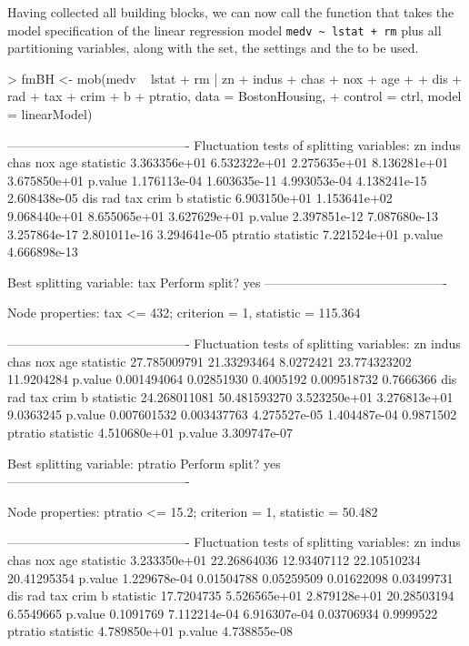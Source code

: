 \documentclass{Z}
\begin{document}
Having collected all building blocks, we can now call the function 
that takes the model specification of the linear regression model \verb:medv ~ lstat + rm:
plus all partitioning variables, along with the  set, the 
settings and the  to be used.

\begin{Schunk}
\begin{Sinput}
> fmBH <- mob(medv ~ lstat + rm | zn + indus + chas + nox + age + 
+     dis + rad + tax + crim + b + ptratio, data = BostonHousing, 
+     control = ctrl, model = linearModel)
\end{Sinput}
\begin{Soutput}
-------------------------------------------
Fluctuation tests of splitting variables:
                    zn        indus         chas          nox          age
statistic 3.363356e+01 6.532322e+01 2.275635e+01 8.136281e+01 3.675850e+01
p.value   1.176113e-04 1.603635e-11 4.993053e-04 4.138241e-15 2.608438e-05
                   dis          rad          tax         crim            b
statistic 6.903150e+01 1.153641e+02 9.068440e+01 8.655065e+01 3.627629e+01
p.value   2.397851e-12 7.087680e-13 3.257864e-17 2.801011e-16 3.294641e-05
               ptratio
statistic 7.221524e+01
p.value   4.666898e-13

Best splitting variable: tax
Perform split? yes
-------------------------------------------

Node properties:
tax <= 432; criterion = 1, statistic = 115.364

-------------------------------------------
Fluctuation tests of splitting variables:
                    zn       indus      chas          nox        age
statistic 27.785009791 21.33293464 8.0272421 23.774323202 11.9204284
p.value    0.001494064  0.02851930 0.4005192  0.009518732  0.7666366
                   dis          rad          tax         crim         b
statistic 24.268011081 50.481593270 3.523250e+01 3.276813e+01 9.0363245
p.value    0.007601532  0.003437763 4.275527e-05 1.404487e-04 0.9871502
               ptratio
statistic 4.510680e+01
p.value   3.309747e-07

Best splitting variable: ptratio
Perform split? yes
-------------------------------------------

Node properties:
ptratio <= 15.2; criterion = 1, statistic = 50.482

-------------------------------------------
Fluctuation tests of splitting variables:
                    zn       indus        chas         nox         age
statistic 3.233350e+01 22.26864036 12.93407112 22.10510234 20.41295354
p.value   1.229678e-04  0.01504788  0.05259509  0.01622098  0.03499731
                 dis          rad          tax        crim         b
statistic 17.7204735 5.526565e+01 2.879128e+01 20.28503194 6.5549665
p.value    0.1091769 7.112214e-04 6.916307e-04  0.03706934 0.9999522
               ptratio
statistic 4.789850e+01
p.value   4.738855e-08


\end{Soutput}
\end{Schunk}
\end{document}
